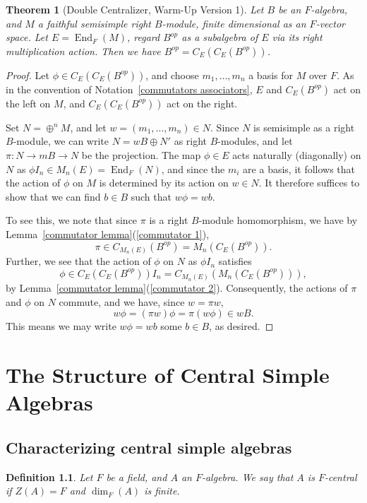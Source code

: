 \documentclass[12pt]{report}
\theoremstyle{plain}
\newtheorem{thm}{Theorem}[section]
\newtheorem{defn}[thm]{Definition}
\newcommand{\oper}[1]{\operatorname{#1}}
\newcommand{\End}{\oper{End}}
\begin{document}
\begin{thm}[Double Centralizer, Warm-Up Version 1] \label{dc1} 
Let $B$ be an $F$-algebra, and $M$ a faithful semisimple right $B$-module,
finite dimensional as an $F$-vector space. Let $E = \End_F(M)$, regard
$B^{op}$ as a subalgebra of $E$ via its right multiplication action. Then
we have $B^{op} = C_E(C_E(B^{op}))$.
\end{thm}
\begin{proof}
Let $\phi \in C_E(C_E(B^{op}))$, and choose $m_1, \ldots, m_n$ a basis for $M$ over
$F$. As in the convention of Notation~\ref{commutators associators}, $E$
and $C_E(B^{op})$
act on the left on $M$, and $C_E(C_E(B^{op}))$ act on the right. 

Set $N = \oplus^n M$, and let $w = (m_1, \ldots, m_n) \in N$. Since $N$ is
semisimple as a right $B$-module, we can write $N = wB \oplus N'$ as right
$B$-modules, and let $\pi : N \to mB \to N$ be the projection. The map $\phi \in
E$ acts naturally (diagonally) on $N$ as $\phi I_n \in M_n(E) = \End_F(N)$,
and since the $m_i$ are a basis, it follows that the action of $\phi$ on
$M$ is determined by its action on $w \in N$. It therefore suffices to show
that we can find $b \in B$ such that $w \phi = w b$.

To see this, we note that since $\pi$ is a right $B$-module homomorphism,
we have by Lemma~\ref{commutator lemma}(\ref{commutator 1}),
\[\pi \in C_{M_n(E)}(B^{op}) = M_n(C_E(B^{op})).\]
Further, we see that the action of $\phi$ on $N$ as $\phi I_n$ satisfies
\[\phi \in C_E(C_E(B^{op})) I_n = C_{M_n(E)}(M_n(C_E(B^{op}))),\]
by Lemma~\ref{commutator lemma}(\ref{commutator 2}). Consequently, the actions of $\pi$ and
$\phi$ on $N$ commute, and we have, since $w = \pi w$,
\[ w \phi = (\pi w) \phi = \pi(w \phi) \in wB.\]
This means we may write $w\phi = wb$ some $b \in B$, as desired.
\end{proof}

\chapter{The Structure of Central Simple Algebras}

\section{Characterizing central simple algebras}

\begin{defn}
Let $F$ be a field, and $A$ an $F$-algebra. We say that $A$ is $F$-central
if $Z(A) = F$ and $\dim_F(A)$ is finite.
\end{defn}
\end{document}
